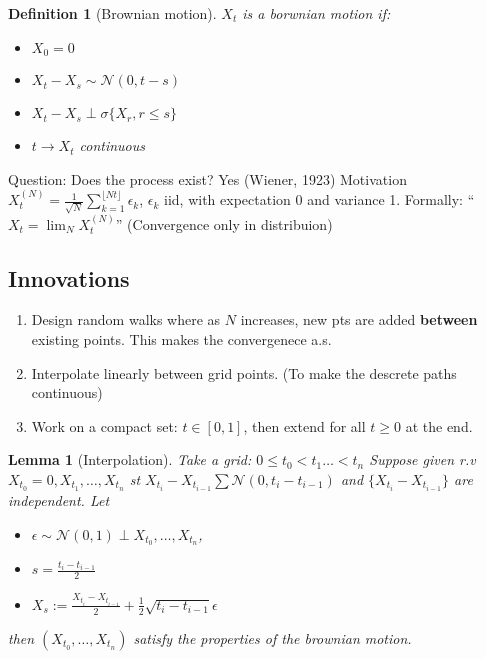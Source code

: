 \documentclass{article}
\newtheorem{definition}{Definition}
\newtheorem{lemma}[theorem]{Lemma}
\begin{document}
\begin{definition}[Brownian motion]
  $X_t$ is a borwnian motion if:
  \begin{itemize}
  \item $X_0 = 0$
  \item $X_t - X_s \sim \mathcal N(0, t-s)$
  \item $X_t - X_s \perp \sigma \{ X_r, r \le s \}$
  \item $t \rightarrow X_t$ continuous
  \end{itemize}
\end{definition}
Question: Does the process exist? Yes (Wiener, 1923)
Motivation $X_t^{(N)} = \frac{1}{\sqrt N} \sum_{k=1}^{\lfloor Nt \rfloor} \epsilon_k$, $\epsilon_k$ iid, with expectation 0 and variance 1.
Formally: ``$X_t = \lim_N X_t^{(N)}$'' (Convergence only in distribuion)

\subsection*{Innovations}
\begin{enumerate}
\item Design random walks where as $N$ increases, new pts are added \textbf{between} existing points. This makes the convergenece a.s.
\item Interpolate linearly between grid points. (To make the descrete paths continuous)
\item Work on a compact set: $t \in [0, 1]$, then extend for all $t \ge 0$ at the end.
\end{enumerate}

\begin{lemma}[Interpolation]
  Take a grid: $0 \le t_0 < t_1 \ldots < t_n$
  Suppose given r.v $X_{t_0} = 0, X_{t_1}, \ldots, X_{t_n}$ st
  $X_{t_i} - X_{t_{i-1}} \sum \mathcal N(0, t_i - t_{i-1})$ and $\{X_{t_i} - X_{t_{i-1}} \}$ are independent.
  Let
  \begin{itemize}
  \item    $\epsilon \sim \mathcal N(0, 1) \perp X_{t_0}, \ldots, X_{t_n}$,
  \item    $s = \frac{t_i - t_{i-1}}{2}$
  \item   $X_s := \frac{X_{t_i} - X_{t_{i-1}}}{2} + \frac12 \sqrt {t_i - t_{i-1}} \epsilon$
  \end{itemize}
  then $(X_{t_0}, \ldots, X_{t_n})$ satisfy the properties of the brownian motion.
\end{lemma}
\end{document}
